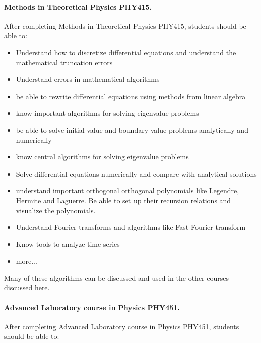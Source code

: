 \documentclass[%
oneside,                 %
final,                   %
10pt]{article}
\begin{document}
\paragraph{Methods in Theoretical Physics PHY415.}
After completing Methods in Theoretical Physics PHY415, students should be able to:
\begin{itemize}
  \item Understand how to discretize differential equations and understand the mathematical truncation errors

  \item Understand errors in mathematical algorithms

  \item be able to rewrite differential equations using methods from linear algebra

  \item know important algorithms for solving eigenvalue problems

  \item be able to solve initial value and boundary value problems analytically and numerically

  \item know central algorithms for solving eigenvalue problems

  \item Solve differential equations numerically and compare with analytical solutions

  \item understand  important orthogonal orthogonal polynomials like Legendre, Hermite and Laguerre. Be able to set up their recursion relations and visualize the polynomials. 

  \item Understand Fourier transforms and algorithms like Fast Fourier transform

  \item Know tools to analyze time series

  \item more...
\end{itemize}

\noindent
Many of these algorithms can be discussed and used in the other courses discussed here.

\paragraph{Advanced Laboratory course in Physics PHY451.}
After completing Advanced Laboratory course in Physics PHY451, students should be able to:
\end{document}
